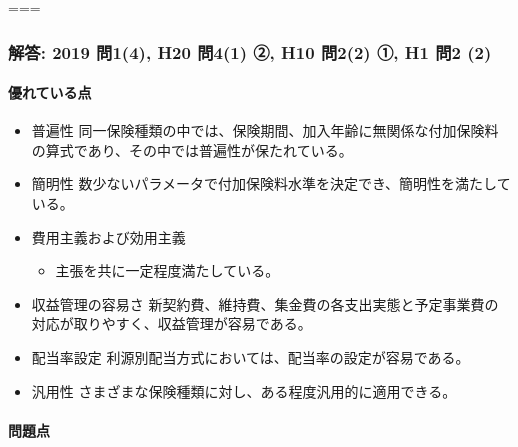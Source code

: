 \documentclass[]{article}
\begin{document}
===

\hypertarget{ux89e3ux7b54-2019-ux554f14-h20-ux554f41-ux2461-h10-ux554f22-ux2460-h1-ux554f2-2}{%
\subsubsection{解答: 2019 問1(4), H20 問4(1) ②, H10 問2(2) ①, H1 問2
(2)}\label{ux89e3ux7b54-2019-ux554f14-h20-ux554f41-ux2461-h10-ux554f22-ux2460-h1-ux554f2-2}}

\hypertarget{ux512aux308cux3066ux3044ux308bux70b9}{%
\paragraph{優れている点}\label{ux512aux308cux3066ux3044ux308bux70b9}}

\begin{itemize}
\tightlist
\item
  普遍性
  同一保険種類の中では、保険期間、加入年齢に無関係な付加保険料の算式であり、その中では普遍性が保たれている。
\item
  簡明性
  数少ないパラメータで付加保険料水準を決定でき、簡明性を満たしている。
\item
  費用主義および効用主義

  \begin{itemize}
  \tightlist
  \item
    主張を共に一定程度満たしている。
  \end{itemize}
\item
  収益管理の容易さ
  新契約費、維持費、集金費の各支出実態と予定事業費の対応が取りやすく、収益管理が容易である。
\item
  配当率設定 利源別配当方式においては、配当率の設定が容易である。
\item
  汎用性 さまざまな保険種類に対し、ある程度汎用的に適用できる。
\end{itemize}

\hypertarget{ux554fux984cux70b9}{%
\paragraph{問題点}\label{ux554fux984cux70b9}}
\end{document}
